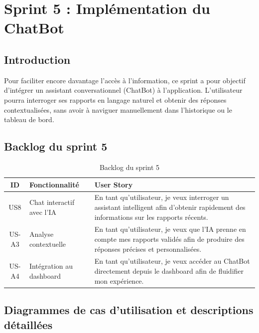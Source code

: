 \chapter{Sprint 5 : Implémentation du ChatBot}

\section*{Introduction}
Pour faciliter encore davantage l'accès à l'information, ce sprint a pour objectif
d'intégrer un assistant conversationnel (ChatBot) à l'application. L'utilisateur
pourra interroger ses rapports en langage naturel et obtenir des réponses
contextualisées, sans avoir à naviguer manuellement dans l'historique ou le
tableau de bord.

\section{Backlog du sprint 5}
\begin{table}[h!]
\centering
\caption{Backlog du sprint 5}
\label{tab:backlog-sprint5}
\renewcommand{\arraystretch}{1.3}
\begin{tabularx}{\textwidth}{|c|l|X|}
\hline
\textbf{ID} & \textbf{Fonctionnalité} & \textbf{User Story} \\ \hline
US8 & Chat interactif avec l'IA &
En tant qu'utilisateur, je veux interroger un assistant intelligent afin d'obtenir
rapidement des informations sur les rapports récents. \\ \hline
US-A3 & Analyse contextuelle &
En tant qu'utilisateur, je veux que l'IA prenne en compte mes rapports validés
afin de produire des réponses précises et personnalisées. \\ \hline
US-A4 & Intégration au dashboard &
En tant qu'utilisateur, je veux accéder au ChatBot directement depuis le dashboard
afin de fluidifier mon expérience. \\ \hline
\end{tabularx}
\end{table}

\section{Diagrammes de cas d'utilisation et descriptions détaillées}

